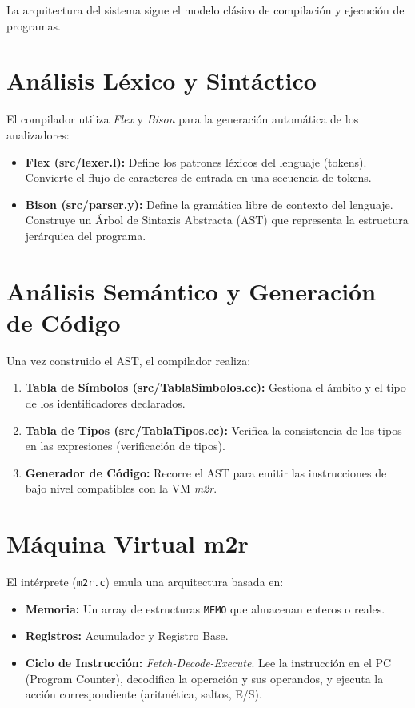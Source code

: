 La arquitectura del sistema sigue el modelo clásico de compilación y ejecución de programas.

\section{Análisis Léxico y Sintáctico}
El compilador utiliza \textit{Flex} y \textit{Bison} para la generación automática de los analizadores:
\begin{itemize}
    \item \textbf{Flex (src/lexer.l):} Define los patrones léxicos del lenguaje (tokens). Convierte el flujo de caracteres de entrada en una secuencia de tokens.
    \item \textbf{Bison (src/parser.y):} Define la gramática libre de contexto del lenguaje. Construye un Árbol de Sintaxis Abstracta (AST) que representa la estructura jerárquica del programa.
\end{itemize}

\section{Análisis Semántico y Generación de Código}
Una vez construido el AST, el compilador realiza:
\begin{enumerate}
    \item \textbf{Tabla de Símbolos (src/TablaSimbolos.cc):} Gestiona el ámbito y el tipo de los identificadores declarados.
    \item \textbf{Tabla de Tipos (src/TablaTipos.cc):} Verifica la consistencia de los tipos en las expresiones (verificación de tipos).
    \item \textbf{Generador de Código:} Recorre el AST para emitir las instrucciones de bajo nivel compatibles con la VM \textit{m2r}.
\end{enumerate}

\section{Máquina Virtual m2r}
El intérprete (\texttt{m2r.c}) emula una arquitectura basada en:
\begin{itemize}
    \item \textbf{Memoria:} Un array de estructuras \texttt{MEMO} que almacenan enteros o reales.
    \item \textbf{Registros:} Acumulador y Registro Base.
    \item \textbf{Ciclo de Instrucción:} \textit{Fetch-Decode-Execute}. Lee la instrucción en el PC (Program Counter), decodifica la operación y sus operandos, y ejecuta la acción correspondiente (aritmética, saltos, E/S).
\end{itemize}
